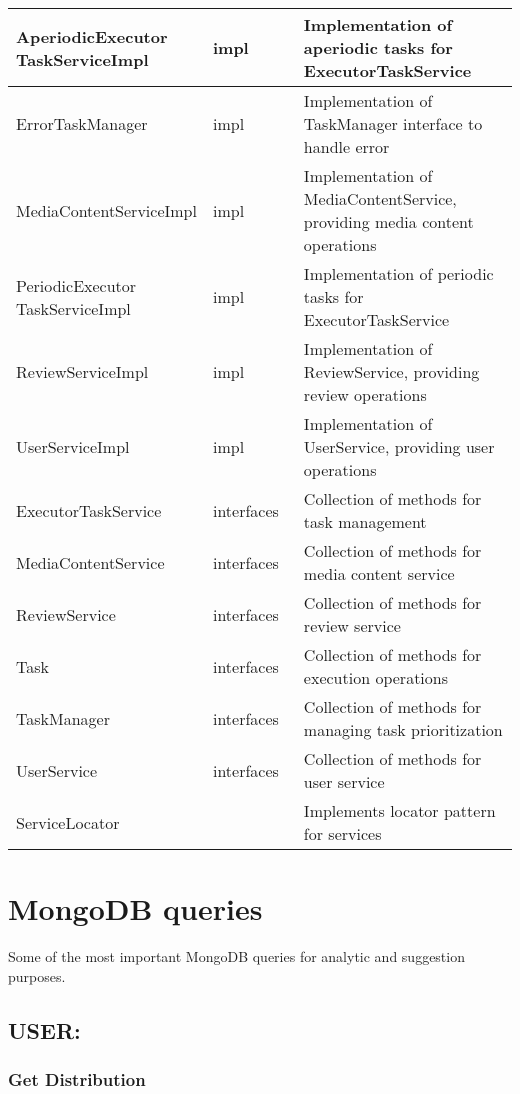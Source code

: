 \begin{longtable}{|>{\raggedright\arraybackslash}p{0.3\linewidth}|>{\raggedright\arraybackslash}p{0.2\linewidth}|>{\raggedright\arraybackslash}p{0.5\linewidth}|}
    \hline
    AperiodicExecutor TaskServiceImpl & impl & Implementation of aperiodic tasks for ExecutorTaskService \\
    \hline
    ErrorTaskManager & impl & Implementation of TaskManager interface to handle error \\
    \hline
    MediaContentServiceImpl & impl & Implementation of MediaContentService, providing media content operations \\
    \hline
    PeriodicExecutor TaskServiceImpl & impl & Implementation of periodic tasks for ExecutorTaskService \\
    \hline
    ReviewServiceImpl & impl & Implementation of ReviewService, providing review operations \\
    \hline
    UserServiceImpl & impl & Implementation of UserService, providing user operations \\
    \hline
    ExecutorTaskService & interfaces & Collection of methods for task management \\
    \hline
    MediaContentService & interfaces & Collection of methods for media content service \\
    \hline
    ReviewService & interfaces & Collection of methods for review service \\
    \hline
    Task & interfaces & Collection of methods for execution operations \\
    \hline
    TaskManager & interfaces & Collection of methods for managing task prioritization \\
    \hline
    UserService & interfaces & Collection of methods for user service \\
    \hline
    ServiceLocator & & Implements locator pattern for services \\
    \hline
\end{longtable}

\section {MongoDB queries}
Some of the most important MongoDB queries for analytic and suggestion purposes. 

\subsection*{USER:}
\subsubsection*{Get Distribution}

